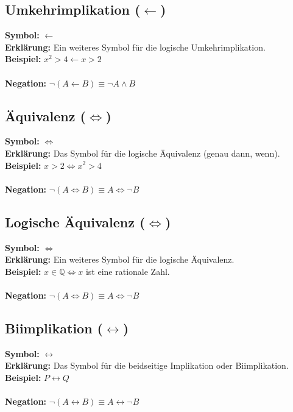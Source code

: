 \documentclass[12pt,a4paper]{article}
\begin{document}
\subsection{Umkehrimplikation (\texorpdfstring{$\leftarrow$}{leftarrow})}
\textbf{Symbol:} $\leftarrow$ \\
\textbf{Erklärung:} Ein weiteres Symbol für die logische Umkehrimplikation. \\
\textbf{Beispiel:} $x^2 > 4 \leftarrow x > 2$ \\ \\
\textbf{Negation:} $\neg (A \leftarrow B) \equiv \neg A \land B$

\subsection{Äquivalenz (\texorpdfstring{$\iff$}{iff})}
\textbf{Symbol:} $\iff$ \\
\textbf{Erklärung:} Das Symbol für die logische Äquivalenz (genau dann, wenn). \\
\textbf{Beispiel:} $x > 2 \iff x^2 > 4$ \\ \\
\textbf{Negation:} $\neg (A \iff B) \equiv A \iff \neg B$

\subsection{Logische Äquivalenz (\texorpdfstring{$\Leftrightarrow$}{Leftrightarrow})}
\textbf{Symbol:} $\Leftrightarrow$ \\
\textbf{Erklärung:} Ein weiteres Symbol für die logische Äquivalenz. \\
\textbf{Beispiel:} $x \in \mathbb{Q} \Leftrightarrow x$ ist eine rationale Zahl. \\ \\
\textbf{Negation:} $\neg (A \Leftrightarrow B) \equiv A \Leftrightarrow \neg B$

\subsection{Biimplikation (\texorpdfstring{$\leftrightarrow$}{leftrightarrow})}
\textbf{Symbol:} $\leftrightarrow$ \\
\textbf{Erklärung:} Das Symbol für die beidseitige Implikation oder Biimplikation. \\
\textbf{Beispiel:} $P \leftrightarrow Q$ \\ \\
\textbf{Negation:} $\neg (A \leftrightarrow B) \equiv A \leftrightarrow \neg B$
\end{document}
